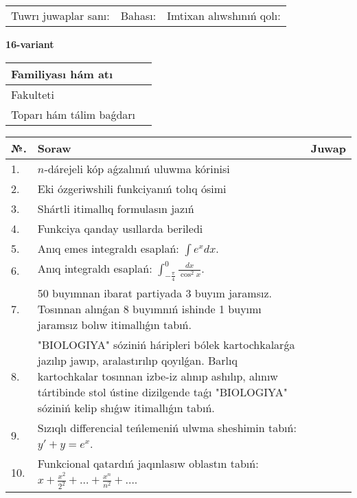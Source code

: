 \documentclass{article}
\begin{document}
\vspace{1cm}

\begin{tabular}{ c c c }
Tuwrı juwaplar sanı: \underline{\hspace{2cm}} & Bahası: \underline{\hspace{2cm}} & Imtixan alıwshınıń qolı: \underline{\hspace{2cm}} \\
\end{tabular}

\newpage

\begin{center}\textbf{16-variant}\end{center}

\bgroup
\def\arraystretch{1.5}
\begin{tabular}{ |m{6cm}|m{10cm}| }
  \hline
  Familiyası hám atı & \\
  \hline
  Fakulteti &\\
  \hline
  Toparı hám tálim baǵdarı & \\
  \hline
\end{tabular}
\egroup

\vspace{0.5cm}

\bgroup
\def\arraystretch{2}
\begin{tabular}{ |l|m{8cm}|m{7cm}| }
  \hline
  №. & Soraw & Juwap \\
  \hline
  1. & $n$-dárejeli kóp aǵzalınıń uluwma kórinisi &  \\
  \hline
  2. & Eki ózgeriwshili funkciyanıń tolıq ósimi &  \\
  \hline
  3. & Shártli itimallıq formulasın jazıń &  \\
  \hline
  4. & Funkciya qanday usıllarda beriledi &  \\
  \hline
  5. & Anıq emes integraldı esaplań: $\displaystyle\int e^{x}dx$. &  \\
  \hline
  6. & Anıq integraldı esaplań: $\displaystyle\int_{-\frac{\pi}{4}}^{0}\frac{dx}{\cos^{2}x}$. &  \\
  \hline
  7. & 50 buyımnan ibarat partiyada 3 buyım jaramsız. Tosınnan alınǵan 8 buyımnıń ishinde 1 buyımı jaramsız bolıw itimallıǵın tabıń. &  \\
  \hline
  8. & "BIOLOGIYA" sóziniń háripleri bólek kartochkalarǵa jazılıp jawıp, aralastırılıp qoyılǵan. Barlıq kartochkalar tosınnan izbe-iz alınıp ashılıp, alınıw tártibinde stol ústine dizilgende taǵı "BIOLOGIYA" sóziniń kelip shıǵıw itimallıǵın tabıń. &  \\
  \hline
  9. & Sızıqlı differencial teńlemeniń ulwma sheshimin tabıń: $y' + y =e^{x}$. &  \\
  \hline
  10. & Funkcional qatardıń jaqınlasıw oblastın tabıń: $\displaystyle x + \frac{x^{2}}{2^{2}} + \ldots + \frac{x^{n}}{n^{2}} + \ldots$. &  \\
  \hline
\end{tabular}
\egroup
\end{document}

